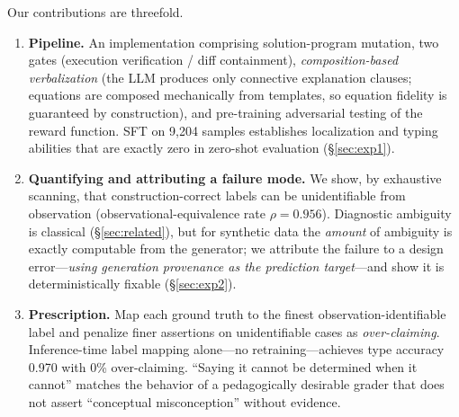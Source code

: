 \documentclass[11pt]{article}
\begin{document}
Our contributions are threefold.
\begin{enumerate}
\item \textbf{Pipeline.} An implementation comprising solution-program mutation, two gates (execution verification / diff containment), \emph{composition-based verbalization} (the LLM produces only connective explanation clauses; equations are composed mechanically from templates, so equation fidelity is guaranteed by construction), and pre-training adversarial testing of the reward function. SFT on 9{,}204 samples establishes localization and typing abilities that are exactly zero in zero-shot evaluation (\S\ref{sec:exp1}).
\item \textbf{Quantifying and attributing a failure mode.} We show, by exhaustive scanning, that construction-correct labels can be unidentifiable from observation (observational-equivalence rate $\rho=0.956$). Diagnostic ambiguity is classical (\S\ref{sec:related}), but for synthetic data the \emph{amount} of ambiguity is exactly computable from the generator; we attribute the failure to a design error---\emph{using generation provenance as the prediction target}---and show it is deterministically fixable (\S\ref{sec:exp2}).
\item \textbf{Prescription.} Map each ground truth to the finest observation-identifiable label and penalize finer assertions on unidentifiable cases as \emph{over-claiming}. Inference-time label mapping alone---no retraining---achieves type accuracy 0.970 with 0\% over-claiming. ``Saying it cannot be determined when it cannot'' matches the behavior of a pedagogically desirable grader that does not assert ``conceptual misconception'' without evidence.
\end{enumerate}
\end{document}
